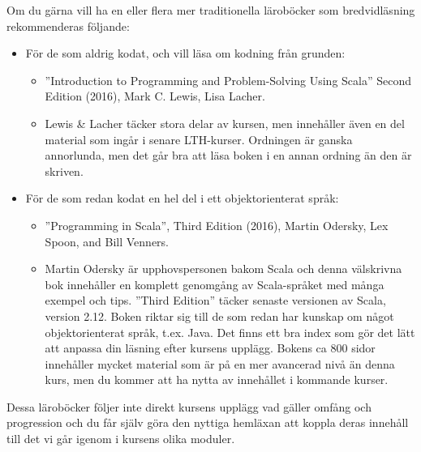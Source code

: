 Om du gärna vill ha en eller flera mer traditionella läroböcker som bredvidläsning rekommenderas följande:
\begin{itemize}[noitemsep, leftmargin=*]
\item För de som aldrig kodat, och vill läsa om kodning från grunden:
\begin{itemize}[nolistsep]
\item ''Introduction to Programming and Problem-Solving Using Scala'' Second Edition (2016), Mark C. Lewis, Lisa Lacher.  %

\item Lewis \& Lacher täcker stora delar av kursen, men innehåller även en del material som ingår i senare LTH-kurser. Ordningen är ganska annorlunda, men det går bra att läsa boken i en annan ordning än den är skriven.
\end{itemize}
\item För de som redan kodat en hel del i ett objektorienterat språk:
\begin{itemize}[nolistsep, noitemsep]
\item ''Programming in Scala'', Third Edition (2016), Martin Odersky, Lex Spoon, and Bill Venners.  %
  \item Martin Odersky är upphovspersonen bakom Scala och denna välskrivna bok innehåller en komplett genomgång av Scala-språket med många exempel och tips. ''Third Edition'' täcker senaste versionen av Scala, version 2.12. Boken riktar sig till de som redan har kunskap om något objektorienterat språk, t.ex. Java. Det finns ett bra index som gör det lätt att anpassa din läsning efter kursens upplägg. Bokens ca 800 sidor innehåller mycket material som är på en mer avancerad nivå än denna kurs, men du kommer att ha nytta av innehållet i kommande kurser.
\end{itemize}
\end{itemize}
Dessa läroböcker följer inte direkt kursens upplägg vad gäller omfång och progression och du får själv göra den nyttiga hemläxan att koppla  deras innehåll till det vi går igenom i kursens olika moduler.


